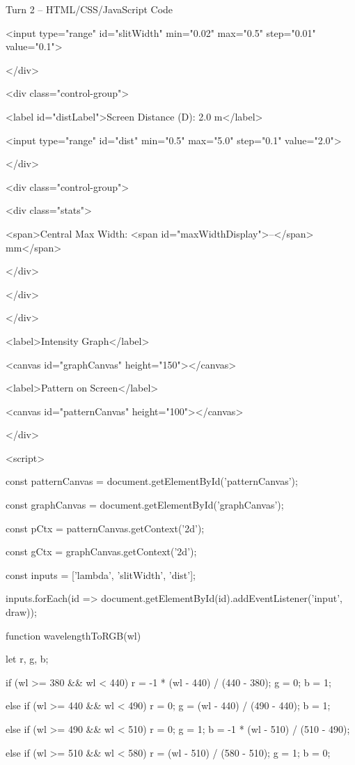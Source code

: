 \documentclass[10pt,a4paper]{article}
\begin{document}
\begin{htmlcodebox}{Turn 2 -- HTML/CSS/JavaScript Code}
{{            <input type="range" id="slitWidth" min="0.02" max="0.5" step="0.01" value="0.1">

        </div>

        <div class="control-group">

            <label id="distLabel">Screen Distance (D): 2.0 m</label>

            <input type="range" id="dist" min="0.5" max="5.0" step="0.1" value="2.0">

        </div>

        <div class="control-group">

            <div class="stats">

                <span>Central Max Width: <span id="maxWidthDisplay">--</span> mm</span>

            </div>

        </div>

    </div>

    <label>Intensity Graph</label>

    <canvas id="graphCanvas" height="150"></canvas>

    <label>Pattern on Screen</label>

    <canvas id="patternCanvas" height="100"></canvas>

</div>

<script>

const patternCanvas = document.getElementById('patternCanvas');

const graphCanvas = document.getElementById('graphCanvas');

const pCtx = patternCanvas.getContext('2d');

const gCtx = graphCanvas.getContext('2d');

const inputs = ['lambda', 'slitWidth', 'dist'];

inputs.forEach(id => document.getElementById(id).addEventListener('input', draw));

function wavelengthToRGB(wl) {

    let r, g, b;

    if (wl >= 380 && wl < 440) { r = -1 * (wl - 440) / (440 - 380); g = 0; b = 1; }

    else if (wl >= 440 && wl < 490) { r = 0; g = (wl - 440) / (490 - 440); b = 1; }

    else if (wl >= 490 && wl < 510) { r = 0; g = 1; b = -1 * (wl - 510) / (510 - 490); }

    else if (wl >= 510 && wl < 580) { r = (wl - 510) / (580 - 510); g = 1; b = 0; }


}}}
\end{htmlcodebox}
\end{document}
